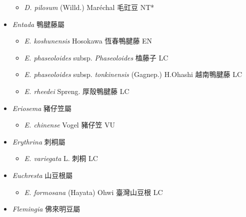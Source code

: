 \begin{itemize}
  \begin{itemize}
        \item[] \textit{D. pilosum} (Willd.) Maréchal  毛豇豆   NT*
  \end{itemize}
 \item[] \textit{Entada} 鴨腱藤屬
                                
  \begin{itemize}
        \item[] \textit{E. koshunensis} Hosokawa  恆春鴨腱藤   EN
        \item[] \textit{E. phaseoloides} subsp. \textit{Phaseoloides}   榼藤子   LC
        \item[] \textit{E. phaseoloides} subsp. \textit{tonkinensis} (Gagnep.) H.Ohashi  越南鴨腱藤   LC
        \item[] \textit{E. rheedei} Spreng.  厚殼鴨腱藤   LC
  \end{itemize}
 \item[] \textit{Eriosema} 豬仔笠屬
                                
  \begin{itemize}
        \item[] \textit{E. chinense} Vogel  豬仔笠   VU
  \end{itemize}
 \item[] \textit{Erythrina} 刺桐屬
                                
  \begin{itemize}
        \item[] \textit{E. variegata} L.  刺桐   LC
  \end{itemize}
 \item[] \textit{Euchresta} 山豆根屬
                                
  \begin{itemize}
        \item[] \textit{E. formosana} (Hayata) Ohwi  臺灣山豆根   LC
  \end{itemize}
 \item[] \textit{Flemingia} 佛來明豆屬
                                

\end{itemize}
